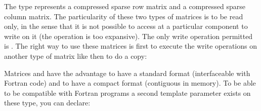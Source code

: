 \documentclass[a4paper,11pt,english]{sphinxmanual}
\begin{document}
\sphinxAtStartPar
The type  represents a compressed sparse row matrix and  a compressed sparse column matrix. The particularity of these two types of matrices is to be read only, in the sense that it is not possible to access at a particular component to write on it (the operation is too expansive). The only write operation permitted is . The right way to use these matrices is first to execute the write operations on another type of matrix like  then to do a copy:

\begin{sphinxVerbatim}[commandchars=\\\{\}]
   
   
  
 
 
 
\end{sphinxVerbatim}

\sphinxAtStartPar
Matrices  and  have the advantage to have a standard format (interfaceable with Fortran code) and to have a compact format (contiguous in memory). To be able to be compatible with Fortran programs a second template parameter exists on these type, you can declare:

\begin{sphinxVerbatim}[commandchars=\\\{\}]
  
  
\end{sphinxVerbatim}
\end{document}
